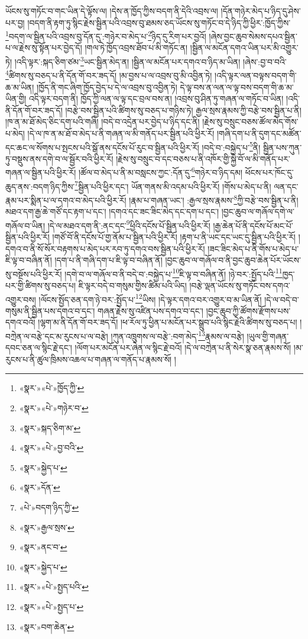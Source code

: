 ཡོངས་སུ་གཏོང་བ་གང་ཡིན་དེ་ལྟོས་ལ། །དེས་ན་ཁྱོད་ཀྱིས་བདག་ནི་དེའི་འབྲས་ལ། །དོན་གཉེར་མེད་པ་ཉིད་དུ་ཤེས་པར་བྱ། །བདག་ནི་རྟག་ཏུ་སྙིང་རྗེས་སྦྱིན་པའི་འབྲས་བུ་ཐམས་ཅད་ཡོངས་སུ་གཏོང་བ་དེ་ཉིད་ཀྱི་ཕྱིར་:ཁྱོད་ཀྱིས་\footnote{«སྣར་»«པེ་»ཁྱོད་ཀྱི་}བདག་ལ་སྦྱིན་པའི་འབྲས་བུ་དོན་དུ་:གཉེར་བ་མེད་པ་\footnote{«སྣར་»«པེ་»གཉེར་བ་}ཉིད་དུ་རིག་པར་བྱའོ། །ཞེས་བྱང་ཆུབ་སེམས་དཔའ་སྦྱིན་པ་ལ་རྗེས་སུ་སྟོན་པར་བྱེད་དོ། །གལ་ཏེ་ཁྱོད་འབྲས་ཐོབ་པ་མི་གཏོང་ན། །སྦྱིན་ལ་མངོན་དགའ་ཡིན་པར་མི་འགྱུར་ཏེ། །འདི་ལྟར་:སྐད་ཅིག་ཙམ་\footnote{«སྣར་»སྐད་ཅིག་མ་}ཡང་སྦྱིན་མེད་ན། །སྦྱིན་ལ་མངོན་པར་དགའ་བ་ཉིད་མ་ཡིན། །ཞེས་:བྱ་བ་བའི་\footnote{«སྣར་»«པེ་»བྱ་བའི་}ཚིགས་སུ་བཅད་པ་ནི་དོན་གོ་བར་ཟད་དོ། །མ་བྱས་པ་ལ་འབྲས་བུ་མི་འབྱིན་ཏེ། །འདི་ལྟར་ལན་བལྟས་བདག་གི་ཆ་མ་ཡིན། །ཁྱོད་ནི་གང་ཞིག་ཁྱོད་བྱེད་པ་དེ་ལ་འབྲས་བུ་འབྱིན་ཏེ། དེ་ལྟ་བས་ན་ལན་ལ་ལྟ་བས་བདག་གི་ཆ་མ་ཡིན་གྱི། འདི་ལྟར་བདག་ནི། ཁྱོད་ཀྱི་ལན་ལ་ལྟ་དང་བྲལ་བས་ན། །འབྲས་བུ་ཤིན་ཏུ་གཞན་ལ་གཏོང་བ་ཡིན། །འདི་ནི་དོན་གོ་བར་ཟད་དོ། །བརྩེ་བས་སྦྱིན་པའི་ཚིགས་སུ་བཅད་པ་གཉིས་ཏེ། རྒྱལ་སྲས་རྣམས་ཀྱི་བརྩེ་བས་སྦྱིན་པ་ནི། །ཁ་ན་མ་ཐོ་མེད་ཅིང་དག་པའི་གཞི། །བདེ་བ་འདྲེན་པར་བྱེད་པ་ཉིད་དང་ནི། །རྗེས་སུ་བསྲུང་བཅས་ཚོལ་མེད་གོས་པ་མེད། །དེ་ལ་ཁ་ན་མ་ཐོ་བ་མེད་པ་ནི་གཞན་ལ་མི་གནོད་པར་སྦྱིན་པའི་ཕྱིར་རོ། །གཞི་དག་པ་ནི་དུག་དང་མཚོན་དང་ཆང་ལ་སོགས་པ་སྤངས་པའི་སྒོ་ནས་དངོས་པོ་རུང་བ་སྦྱིན་པའི་ཕྱིར་རོ། །བདེ་བ་:བསྐྱེད་པ་\footnote{«སྣར་»སྐྱེད་པ་}ནི། སྦྱིན་པས་ཀུན་ཏུ་བསྡུས་ནས་དགེ་བ་ལ་སྦྱོར་བའི་ཕྱིར་རོ། །རྗེས་སུ་བསྲུང་བ་དང་བཅས་པ་ནི་འཁོར་གྱི་སྐྱེ་བོ་ལ་མི་གནོད་པར་གཞན་ལ་སྦྱིན་པའི་ཕྱིར་རོ། །ཚོལ་བ་མེད་པ་ནི་མ་བསླངས་ཀྱང་:དོན་དུ་\footnote{«སྣར་»དོན་}གཉེར་བ་ཉིད་དམ། ཕོངས་པར་ཁོང་དུ་ཆུད་ནས་:བདག་ཉིད་ཀྱིས་\footnote{«པེ་»བདག་ཉིད་ཀྱི་}སྦྱིན་པའི་ཕྱིར་དང་། ཡོན་གནས་མི་འདམ་པའི་ཕྱིར་རོ། །གོས་པ་མེད་པ་ནི། ལན་དང་རྣམ་པར་སྨིན་པ་ལ་དགའ་བ་མེད་པའི་ཕྱིར་རོ། །རྣམ་པ་གཞན་ཡང་། :རྒྱལ་སྲས་རྣམས་\footnote{«སྣར་»རྒྱལ་སྲས་}ཀྱི་བརྩེ་བས་སྦྱིན་པ་ནི། མཐའ་དག་རྒྱ་ཆེ་གཙོ་དང་རྟག་པ་དང་། །དགའ་དང་ཟང་ཟིང་མེད་དང་དག་པ་དང་། །བྱང་ཆུབ་ལ་གཞོལ་དགེ་ལ་གཞོལ་བ་ཡིན། །དེ་ལ་མཐའ་དག་ནི་:ནང་དང་\footnote{«སྣར་»ནང་བ་}ཕྱིའི་དངོས་པོ་སྦྱིན་པའི་ཕྱིར་རོ། །རྒྱ་ཆེན་པོ་ནི་དངོས་པོ་མང་པོ་སྦྱིན་པའི་ཕྱིར་རོ། །གཙོ་བོ་ནི་དངོས་པོ་གྱ་ནོམ་པ་སྦྱིན་པའི་ཕྱིར་རོ། །རྟག་པ་ནི་ཡང་དང་ཡང་དུ་སྦྱིན་པའི་ཕྱིར་རོ། །དགའ་བ་ནི་སོ་སོར་བརྟགས་པ་མེད་པར་རབ་ཏུ་དགའ་བས་སྦྱིན་པའི་ཕྱིར་རོ། །ཟང་ཟིང་མེད་པ་ནི་གོས་པ་མེད་པ་ཇི་ལྟ་བ་བཞིན་ནོ། །དག་པ་ནི་གཞི་དག་པ་ཇི་ལྟ་བ་བཞིན་ནོ། །བྱང་ཆུབ་ལ་གཞོལ་བ་ནི་བྱང་ཆུབ་ཆེན་པོར་ཡོངས་སུ་བསྔོས་པའི་ཕྱིར་རོ། །དགེ་བ་ལ་གཞོལ་བ་ནི་བདེ་བ་:བསྐྱེད་པ་\footnote{«སྣར་»སྐྱེད་པ་}ཇི་ལྟ་བ་བཞིན་ནོ། །ཉེ་བར་:སྤྱོད་པའི་\footnote{«སྣར་»«པེ་»སྤྱད་པའི་}ཁྱད་པར་གྱི་ཚིགས་སུ་བཅད་པ། ཇི་ལྟར་བདེ་བ་གསུམ་གྱིས་ཚིམ་པའི་ཡིད། །བརྩེ་ལྡན་ཡོངས་སུ་གཏོང་བས་དགའ་འགྱུར་བས། །ལོངས་སྤྱོད་ཅན་དག་ཉེ་བར་:སྤྱོད་པ་\footnote{«སྣར་»«པེ་»སྤྱད་པ་}ཡིས། །དེ་ལྟར་དགའ་བར་འགྱུར་བ་མ་ཡིན་ནོ། །དེ་ལ་བདེ་བ་གསུམ་ནི་སྦྱིན་པས་དགའ་བ་དང་། གཞན་རྗེས་སུ་འཛིན་པས་དགའ་བ་དང་། །བྱང་ཆུབ་ཀྱི་ཚོགས་རྫོགས་པས་དགའ་བའོ། །ལྷག་མ་ནི་དོན་གོ་བར་ཟད་དོ། །ཕ་རོལ་ཏུ་ཕྱིན་པ་མངོན་པར་སྒྲུབ་པའི་སྙིང་རྗེའི་ཚིགས་སུ་བཅད་པ། །བཀྲེན་ལ་བརྩེ་དང་མ་རུངས་པ་ལ་བརྩེ། །ཀུན་འཁྲུགས་ལ་བརྩེ་:བག་མེད་\footnote{«སྣར་»བག་ཆེན་}རྣམས་ལ་བརྩེ། །ཡུལ་གྱི་གཞན་དབང་ཅན་ལ་སྙིང་རྗེ་དང་། །ལོག་པར་མངོན་པར་ཞེན་ལ་སྙིང་རྗེ་བའོ། །དེ་ལ་བཀྲེན་པ་ནི་སེར་སྣ་ཅན་རྣམས་སོ། །མ་རུངས་པ་ནི་ཚུལ་ཁྲིམས་འཆལ་པ་གཞན་ལ་གནོད་པ་རྣམས་སོ། །
